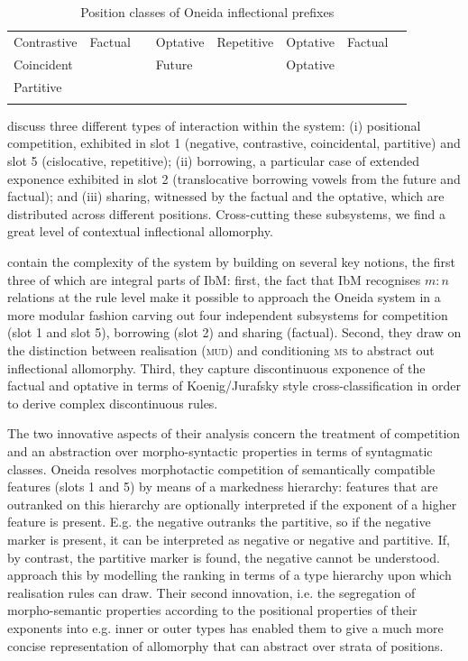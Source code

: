 \documentclass[output=paper
	        ,collection
	        ,collectionchapter
 	        ,biblatex
                ,babelshorthands
                ,newtxmath
                ,draftmode
                ,colorlinks, citecolor=brown
]{./langsci/langscibook}
\begin{document}
{\begin{table}[htb]
\begin{tabular}{l|l|l|l|l|l|l|l}
    Contrastive & Factual & & Optative & Repetitive & Optative &
                                                                 Factual
                 & \\
    Coincident & & & Future & & Optative & &  \\
    Partitive & & & & & & &\\
    \lspbottomrule
  \end{tabular}
  \caption{Position classes of Oneida inflectional prefixes \citep{diaz:koenig:michelson:19}}
  \label{tab:Oneida}
\end{table}

\citet{diaz:koenig:michelson:19} discuss three different types of
interaction within the system: (i) positional competition, exhibited
in slot 1 (negative, contrastive, coincidental, partitive) and slot 5
(cislocative, repetitive); (ii) borrowing, a particular case of extended
exponence exhibited in slot 2 (translocative borrowing vowels from the
future and factual); and (iii) sharing, witnessed by the factual and
the optative, which are distributed across different positions. Cross-cutting these subsystems, we find a great level of
contextual inflectional allomorphy.

\citet{diaz:koenig:michelson:19} contain the complexity of the system
by building on several key notions, the first three of
which are integral parts of IbM: first, the fact that IbM recognises
$m:n$ relations at the rule level make it possible to approach the
Oneida system in a more modular fashion carving out four independent
subsystems for competition (slot 1 and slot 5), borrowing (slot 2) and
sharing (factual). Second, they draw on the distinction between
realisation (\textsc{mud}) and conditioning \textsc{ms} to abstract
out inflectional allomorphy. Third, they capture discontinuous
exponence of the factual and optative in terms of Koenig/Jurafsky
style cross-classification in order to derive complex discontinuous
rules.

The two innovative aspects of their analysis concern the treatment of
competition and an abstraction over morpho-syntactic properties in
terms of syntagmatic classes. Oneida resolves morphotactic competition
of semantically compatible features (slots 1 and 5) by means of a
markedness hierarchy: features that are outranked on this hierarchy
are optionally interpreted if the exponent of a higher feature is
present. E.g. the negative outranks the partitive, so if the negative
marker is present, it can be interpreted as negative or negative and
partitive. If, by contrast, the partitive marker is found, the
negative cannot be understood.  \citet{diaz:koenig:michelson:19}
approach this by modelling the ranking in terms of a type hierarchy
upon which realisation rules can draw. Their second innovation, i.e. 
the  segregation of morpho-semantic properties according to
the positional properties of their exponents into e.g. inner or outer
types has enabled them to give a much more concise representation of
allomorphy that can abstract over strata of positions. 

}
\end{document}
